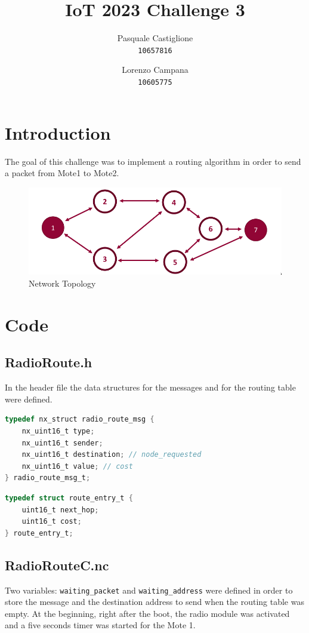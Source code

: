 \documentclass[11pt]{article}
\title{\textbf{IoT 2023 Challenge 3}}
\author{
  Pasquale Castiglione\\
	\texttt{10657816}
  \and
  Lorenzo Campana\\
  \texttt{10605775}
}
\date{}
\begin{document}
\maketitle

\section{Introduction}
The goal of this challenge was to implement a routing algorithm in order to send a packet from Mote1 to Mote2.
\begin{figure}[h]
\includegraphics[width=\textwidth]{topology.png}
\caption{Network Topology}
\end{figure}
\section{Code}
\subsection{RadioRoute.h}
In the header file the data structures for the messages and for the routing table were defined.
\begin{lstlisting}[language=C]
typedef nx_struct radio_route_msg {
	nx_uint16_t type;
	nx_uint16_t sender;
	nx_uint16_t destination; // node_requested
	nx_uint16_t value; // cost
} radio_route_msg_t;
\end{lstlisting}

\begin{lstlisting}[language=C]
typedef struct route_entry_t {
	uint16_t next_hop;
  	uint16_t cost;
} route_entry_t;
\end{lstlisting}

\subsection{RadioRouteC.nc}
Two variables: \texttt{waiting\_packet} and \texttt{waiting\_address} were defined in order to store the message and the destination address to send when the routing table was empty.
At the beginning, right after the boot, the radio module was activated and a five seconds timer was started for the Mote 1.
\end{document}

